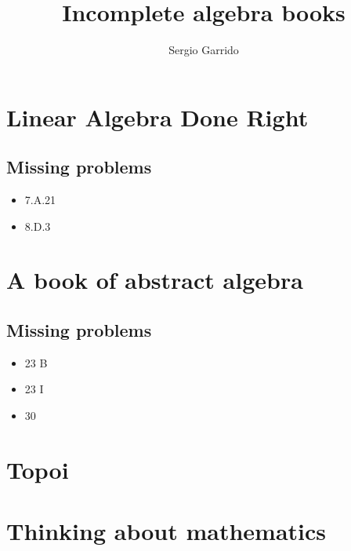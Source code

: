 \documentclass{bookSolutions}
\title{Incomplete algebra books}
\author{Sergio Garrido}
\begin{document}
\tableofcontents
\newpage

\section{Linear Algebra Done Right}
\subsection{Missing problems}
\begin{itemize}
    \item 7.A.21
    \item 8.D.3
\end{itemize}

























\newpage
\section{A book of abstract algebra}
\subsection{Missing problems}
\begin{itemize}
    \item 23 B
    \item 23 I
    \item 30
\end{itemize}


















\newpage
\section{Topoi}


\newpage
\section{Thinking about mathematics}

\end{document}
